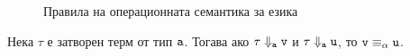 \begin{figure}[H]
  \vspace{10pt}

  \begin{subfigure}[b]{0.5\textwidth}
    \begin{prooftree}
    \end{prooftree}
  \end{subfigure}
  ~
  \begin{subfigure}[b]{0.5\textwidth}
    \begin{prooftree}
    \end{prooftree}
  \end{subfigure}

  \vspace{10pt}

  \begin{subfigure}[b]{0.5\textwidth}
    \begin{prooftree}
    \end{prooftree}
  \end{subfigure}
  ~
  \begin{subfigure}[b]{0.5\textwidth}
  \begin{prooftree}
  \end{prooftree}
\end{subfigure}
\caption{Правила на операционната семантика за езика \PCFPP}
\end{figure}




\begin{lemma}
  Нека $\tau$ е затворен терм от тип $\vv{a}$.
  Тогава ако $\tau \Downarrow_{\vv{a}} \vv{v}$ и $\tau \Downarrow_{\vv{a}} \vv{u}$, то
  $\vv{v} \equiv_\alpha \vv{u}$.
\end{lemma}


